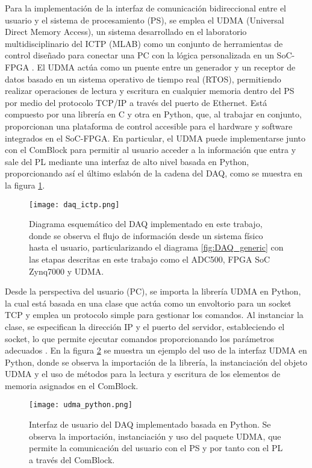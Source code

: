 \documentclass{report}
\begin{document}
\noindent Para la implementación de la interfaz de comunicación bidireccional entre el usuario y el sistema de procesamiento (PS), se emplea el UDMA (Universal Direct Memory Access), un sistema desarrollado en el laboratorio multidisciplinario del ICTP (MLAB) como un conjunto de herramientas de control diseñado para conectar una PC con la lógica personalizada en un SoC-FPGA \cite{crespo2021remote}. El UDMA actúa como un puente entre un generador y un receptor de datos basado en un sistema operativo de tiempo real (RTOS), permitiendo realizar operaciones de lectura y escritura en cualquier memoria dentro del PS por medio del protocolo TCP/IP a través del puerto de Ethernet. Está compuesto por una librería en C y otra en Python, que, al trabajar en conjunto, proporcionan una plataforma de control accesible para el hardware y software integrados en el SoC-FPGA. En particular, el UDMA puede implementarse junto con el ComBlock para permitir al usuario acceder a la información que entra y sale del PL mediante una interfaz de alto nivel basada en Python, proporcionando así el último eslabón de la cadena del DAQ, como se muestra en la figura \ref{fig:daq-ictp}.

\begin{figure}[H]
    \centering
    \texttt{[image: daq\_ictp.png]}
    \caption{Diagrama esquemático del DAQ implementado en este trabajo, donde se observa el flujo de información desde un sistema físico hasta el usuario, particularizando el diagrama \ref{fig:DAQ_generic} con las etapas descritas en este trabajo como el ADC500, FPGA SoC Zynq7000 y UDMA.}
    \label{fig:daq-ictp}
\end{figure}

\noindent Desde la perspectiva del usuario (PC), se importa la librería UDMA en Python, la cual está basada en una clase que actúa como un envoltorio para un socket TCP y emplea un protocolo simple para gestionar los comandos. Al instanciar la clase, se especifican la dirección IP y el puerto del servidor, estableciendo el socket, lo que permite ejecutar comandos proporcionando los parámetros adecuados \cite{udma_gitlab}. En la figura \ref{fig:udma_python} se muestra un ejemplo del uso de la interfaz UDMA en Python, donde se observa la importación de la librería, la instanciación del objeto UDMA y el uso de métodos para la lectura y escritura de los elementos de memoria asignados en el ComBlock.

\begin{figure}[H]
    \centering
    \texttt{[image: udma\_python.png]}
    \caption{Interfaz de usuario del DAQ implementado basada en Python. Se observa la importación, instanciación y uso del paquete UDMA, que permite la comunicación del usuario con el PS y por tanto con el PL a través del ComBlock.}
    \label{fig:udma_python}
\end{figure}
\end{document}

